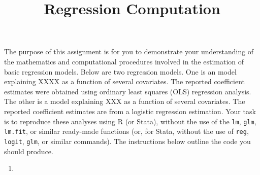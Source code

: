 \documentclass[a4paper,11pt]{article}
\title{Regression Computation}
\author{}
\date{}
\begin{document}
\maketitle



\vspace{2em}

\noindent The purpose of this assignment is for you to demonstrate your understanding of the mathematics and computational procedures involved in the estimation of basic regression models. Below are two regression models. One is an model explaining XXXX as a function of several covariates. The reported coefficient estimates were obtained using ordinary least squares (OLS) regression analysis. The other is a model explaining XXX as a function of several covariates. The reported coefficient estimates are from a logistic regression estimation. Your task is to reproduce these analyses using R (or Stata), without the use of the \texttt{lm}, \texttt{glm}, \texttt{lm.fit}, or similar ready-made functions (or, for Stata, without the use of \texttt{reg}, \texttt{logit}, \texttt{glm}, or similar commands). The instructions below outline the code you should produce.

\begin{enumerate}
\item 

\end{enumerate}
\end{document}
